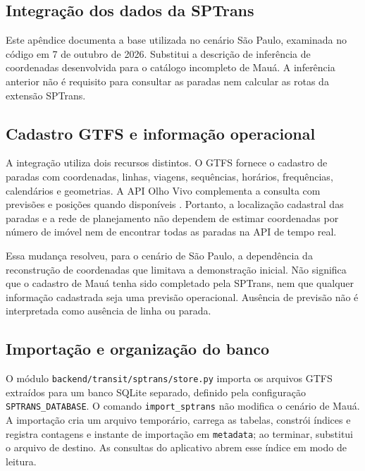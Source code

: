 \documentclass[12pt,oneside,a4paper,brazil,chapter=TITLE]{abntex2}
\let\papsection\section
\renewcommand{\section}{\clearpage\papsection}
\begin{document}
\begin{apendicesenv}
\chapter{Integração dos dados da SPTrans}
\label{ap:importacao}
Este apêndice documenta a base utilizada no cenário São Paulo, examinada no código em 7 de outubro de 2026. Substitui a descrição de inferência de coordenadas desenvolvida para o catálogo incompleto de Mauá. A inferência anterior não é requisito para consultar as paradas nem calcular as rotas da extensão SPTrans.

\section{Cadastro GTFS e informação operacional}
A integração utiliza dois recursos distintos. O GTFS fornece o cadastro de paradas com coordenadas, linhas, viagens, sequências, horários, frequências, calendários e geometrias. A API Olho Vivo complementa a consulta com previsões e posições quando disponíveis \citep{gtfs,sptransapi}. Portanto, a localização cadastral das paradas e a rede de planejamento não dependem de estimar coordenadas por número de imóvel nem de encontrar todas as paradas na API de tempo real.

Essa mudança resolveu, para o cenário de São Paulo, a dependência da reconstrução de coordenadas que limitava a demonstração inicial. Não significa que o cadastro de Mauá tenha sido completado pela SPTrans, nem que qualquer informação cadastrada seja uma previsão operacional. Ausência de previsão não é interpretada como ausência de linha ou parada.

\section{Importação e organização do banco}
O módulo \nolinkurl{backend/transit/sptrans/store.py} importa os arquivos GTFS extraídos para um banco SQLite separado, definido pela configuração \texttt{SPTRANS\_DATABASE}. O comando \texttt{import\_sptrans} não modifica o cenário de Mauá. A importação cria um arquivo temporário, carrega as tabelas, constrói índices e registra contagens e instante de importação em \texttt{metadata}; ao terminar, substitui o arquivo de destino. As consultas do aplicativo abrem esse índice em modo de leitura.


\end{apendicesenv}
\end{document}
